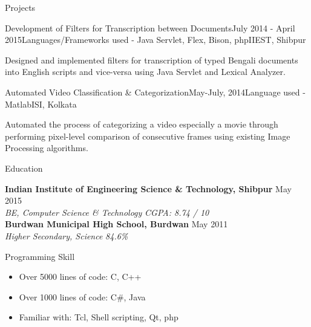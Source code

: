 \documentclass{resume}
\begin{document}

\begin{rSection}{Projects}

\begin{rSubsection}{Development of Filters for Transcription between Documents}{}{July 2014 - April 2015}{Languages/Frameworks used - Java Servlet, Flex, Bison, php}{IIEST, Shibpur}
\item Designed and implemented filters for transcription of typed Bengali documents into English scripts and vice-versa using Java Servlet and Lexical Analyzer.
\end{rSubsection}

\begin{rSubsection}{Automated Video Classification \& Categorization}{}{May-July, 2014}{Language used - Matlab}{ISI, Kolkata}{}
\item Automated the process of categorizing a video especially a movie through performing pixel-level comparison of consecutive frames using existing Image Processing algorithms.
\end{rSubsection}

\end{rSection}



\begin{rSection}{Education}

{\bf Indian Institute of Engineering Science \& Technology, Shibpur} \hfill May 2015 \\ 
{\em BE, Computer Science \& Technology} \hfill {\em CGPA: 8.74 / 10} \smallskip \smallskip \\
{\bf Burdwan Municipal High School, Burdwan} \hfill May 2011 \\ 
{\em Higher Secondary, Science} \hfill {\em 84.6\%} \\  

\end{rSection}


\begin{rSection}{Programming Skill}
\renewcommand\labelitemi{$\cdot$}
\begin{itemize}[leftmargin=0em]
  \item Over 5000 lines of code: C, C++
  \item Over 1000 lines of code: C\#, Java
  \item Familiar with: Tcl, Shell scripting, Qt, php
\end{itemize}


\end{rSection}

\end{document}
